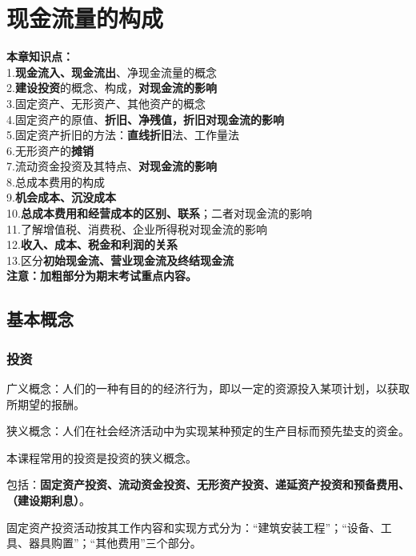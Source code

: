 \chapter{现金流量的构成}
\noindent \textbf{本章知识点：}\\
1.\textbf{现金流入、现金流出}、净现金流量的概念\\
2.\textbf{建设投资}的概念、构成，\textbf{对现金流的影响}\\
3.固定资产、无形资产、其他资产的概念\\
4.固定资产的原值、\textbf{折旧、净残值，折旧对现金流的影响}\\
5.固定资产折旧的方法：\textbf{直线折旧}法、工作量法\\
6.无形资产的\textbf{摊销}\\
7.流动资金投资及其特点、\textbf{对现金流的影响}\\
8.总成本费用的构成\\
9.\textbf{机会成本、沉没成本}\\
10.\textbf{总成本费用和经营成本的区别、联系}；二者对现金流的影响\\
11.了解增值税、消费税、企业所得税对现金流的影响\\
12.\textbf{收入、成本、税金和利润的关系}\\
13.区分\textbf{初始现金流、营业现金流及终结现金流}\\
\textbf{注意：加粗部分为期末考试重点内容。}

\section{基本概念}

\subsection{投资}

广义概念：人们的一种有目的的经济行为，即以一定的资源投入某项计划，以获取所期望的报酬。

狭义概念：人们在社会经济活动中为实现某种预定的生产目标而预先垫支的资金。

本课程常用的投资是投资的狭义概念。

包括：\textbf{固定资产投资、流动资金投资、无形资产投资、递延资产投资和预备费用、（建设期利息）}。

固定资产投资活动按其工作内容和实现方式分为：“建筑安装工程”；“设备、工具、器具购置”；“其他费用”三个部分。

